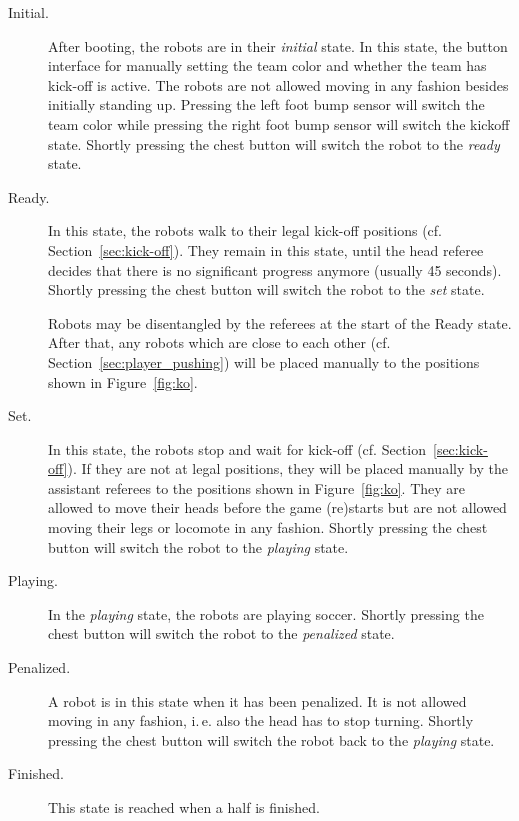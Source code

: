 \documentclass[12pt]{article}
\newcommand{\ie}{\mbox{i.\,e.}\xspace}
\newcommand{\eg}{\mbox{e.\,g.}\xspace}
\newcommand{\cf}{\mbox{cf.}\xspace}
\begin{document}
\begin{description}

\item[Initial.] After booting, the robots are in their \emph{initial} state. In this state, the button interface for manually setting the team color and whether the team has kick-off is active. The robots are not allowed moving in any fashion besides initially standing up. Pressing the left foot bump sensor will switch the team color while pressing the right foot bump sensor will switch the kickoff state. Shortly pressing the chest button will switch the robot to the \emph{ready} state.



\item[Ready.] In this state, the robots walk to their legal kick-off positions (\cf Section~\ref{sec:kick-off}). They remain in this state, until the head referee decides that there is no significant progress anymore (usually 45 seconds). Shortly pressing the chest button will switch the robot to the \emph{set} state.%

Robots may be disentangled by the referees at the start of the Ready state.  After that, any robots which are close to each other (\cf Section~\ref{sec:player_pushing}) will be placed manually to the positions shown in Figure~\ref{fig:ko}.

\item[Set.] In this state, the robots stop and wait for kick-off (\cf Section~\ref{sec:kick-off}). If they are not at legal positions, they will be placed manually by the assistant referees to the positions shown in Figure~\ref{fig:ko}. They are allowed to move their heads before the game (re)starts but are not allowed moving their legs or locomote in any fashion. Shortly pressing the chest button will switch the robot to the \emph{playing} state.


\item[Playing.] In the \emph{playing} state, the robots are playing soccer. Shortly pressing the chest button will switch the robot to the \emph{penalized} state.%
\item[Penalized.] A robot is in this state when it has been penalized. It is not allowed moving in any fashion, \ie also the head has to stop turning. Shortly pressing the chest button will switch the robot back to the \emph{playing} state.
\item[Finished.] This state is reached when a half is finished.
\end{description}
\end{document}
